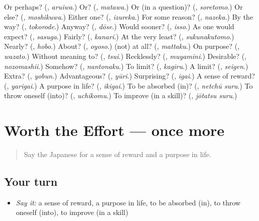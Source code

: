 \begin{tcolorbox}[breakable,colback=teal!4,colframe=teal!35!black,title={Before you move on}]
Or perhaps? (\textbf{}, \emph{aruiwa}.) Or? (\textbf{}, \emph{matawa}.) Or (in a question)? (\textbf{}, \emph{soretomo}.) Or else? (\textbf{}, \emph{moshikuwa}.) Either one? (\textbf{}, \emph{izureka}.) For some reason? (\textbf{}, \emph{nazeka}.) By the way? (\textbf{}, \emph{tokorode}.) Anyway? (\textbf{}, \emph{dōse}.) Would sooner? (\textbf{}, \emph{isso}.) As one would expect? (\textbf{}, \emph{sasuga}.) Fairly? (\textbf{}, \emph{kanari}.) At the very least? (\textbf{}, \emph{sukunakutomo}.) Nearly? (\textbf{}, \emph{hobo}.) About? (\textbf{}, \emph{oyoso}.) (not) at all? (\textbf{}, \emph{mattaku}.) On purpose? (\textbf{}, \emph{wazato}.) Without meaning to? (\textbf{}, \emph{tsui}.) Recklessly? (\textbf{}, \emph{muyamini}.) Desirable? (\textbf{}, \emph{nozomashii}.) Somehow? (\textbf{}, \emph{nantonaku}.) To limit? (\textbf{}, \emph{kagiru}.) A limit? (\textbf{}, \emph{seigen}.) Extra? (\textbf{}, \emph{yobun}.) Advantageous? (\textbf{}, \emph{yūri}.) Surprising? (\textbf{}, \emph{igai}.) A sense of reward? (\textbf{}, \emph{yarigai}.) A purpose in life? (\textbf{}, \emph{ikigai}.) To be absorbed (in)? (\textbf{}, \emph{netchū suru}.) To throw oneself (into)? (\textbf{}, \emph{uchikomu}.) To improve (in a skill)? (\textbf{}, \emph{jōtatsu suru}.)
\end{tcolorbox}
\section[(dialogue)]{Worth the Effort — once more}

\label{lesson:JA-R533-review-final-533}



\begin{quote}
Say the Japanese for a sense of reward and a purpose in life.
\end{quote}

\subsection*{Your turn}
\begin{itemize}
\raggedright
  \item \emph{Say it:} a sense of reward, a purpose in life, to be absorbed (in), to throw oneself (into), to improve (in a skill)
\end{itemize}

